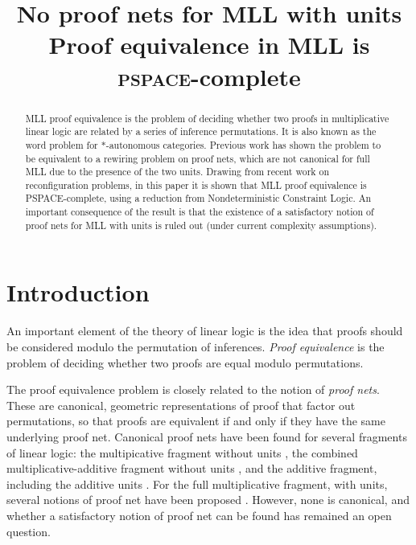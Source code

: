 \documentclass[conference]{IEEEtran}
\author{
  \IEEEauthorblockN{Willem Heijltjes}
  \IEEEauthorblockA{
  		University of Bath
	\\	Claverton Down
	\\	Bath BA2~7AY
	\\	w.b.heijltjes@bath.ac.uk
	}
\and
  \IEEEauthorblockN{Robin Houston}
  \IEEEauthorblockA{
		Kiln Enterprises
	\\	robin.houston@gmail.com	
	}
}
\title{No proof nets for MLL with units\\[5pt]\Large Proof equivalence in MLL is \textsc{pspace}-complete}
\begin{document}
\maketitle

\begin{abstract}
MLL proof equivalence is the problem of deciding whether two proofs in multiplicative linear logic are related by a series of inference permutations.
%
It is also known as the word problem for $*$-autonomous categories.
%
Previous work has shown the problem to be equivalent to a rewiring problem on proof nets, which are not canonical for full MLL due to the presence of the two units.
%
Drawing from recent work on reconfiguration problems, in this paper it is shown that MLL proof equivalence is PSPACE-complete, using a reduction from Nondeterministic Constraint Logic.
%
An important consequence of the result is that the existence of a satisfactory notion of proof nets for MLL with units is ruled out (under current complexity assumptions).
\end{abstract}



\section{Introduction}


An important element of the theory of linear logic \cite{Girard-1987} is the idea that proofs should be considered modulo the permutation of inferences.
%
%
\emph{Proof equivalence} is the problem of deciding whether two proofs are equal modulo permutations.


The proof equivalence problem is closely related to the notion of \emph{proof nets}.
%
These are canonical, geometric representations of proof that factor out permutations, so that proofs are equivalent if and only if they have the same underlying proof net.
%
Canonical proof nets have been found for several fragments of linear logic: the multipicative fragment without units \cite{Girard-1987,Danos-Regnier-1989}, the combined multiplicative-additive fragment without units \cite{Hughes-vanGlabbeek-2005}, and the additive fragment, including the additive units \cite{Heijltjes-2011}.
%
For the full multiplicative fragment, with units, several notions of proof net have been proposed \cite{BCST,Strassburger-lamarche-2004,HughesFreeStar}.
%
However, none is canonical, and whether a satisfactory notion of proof net can be found has remained an open question.
\end{document}
